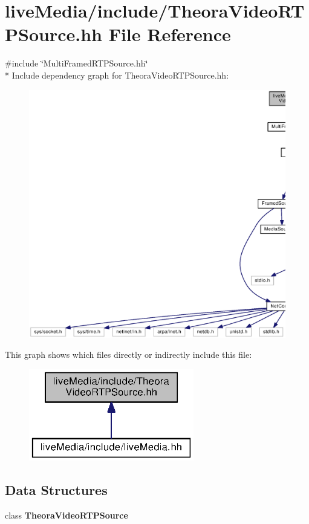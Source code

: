 \section{live\+Media/include/\+Theora\+Video\+R\+T\+P\+Source.hh File Reference}
\label{TheoraVideoRTPSource_8hh}
{\ttfamily \#include \char`\"{}Multi\+Framed\+R\+T\+P\+Source.\+hh\char`\"{}}\\*
Include dependency graph for Theora\+Video\+R\+T\+P\+Source.\+hh\+:
\nopagebreak
\begin{figure}[H]
\begin{center}
\leavevmode
\includegraphics[width=350pt]{TheoraVideoRTPSource_8hh__incl}
\end{center}
\end{figure}
This graph shows which files directly or indirectly include this file\+:
\nopagebreak
\begin{figure}[H]
\begin{center}
\leavevmode
\includegraphics[width=204pt]{TheoraVideoRTPSource_8hh__dep__incl}
\end{center}
\end{figure}
\subsection*{Data Structures}
\begin{DoxyCompactItemize}
\item 
class {\bf Theora\+Video\+R\+T\+P\+Source}
\end{DoxyCompactItemize}
